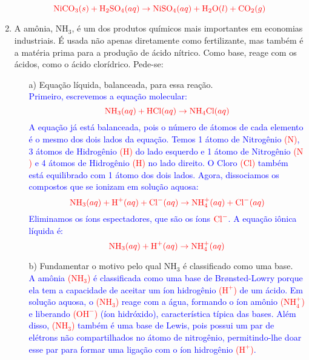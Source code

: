 \documentclass[a4paper, 12pt]{article}
\begin{document}
\begin{enumerate}
          \[
              \textcolor{red}{\text{NiCO}_3 (s) + \text{H}_2\text{SO}_4 (aq) \rightarrow \text{NiSO}_4 (aq) + \text{H}_2\text{O} (l) + \text{CO}_2 (g)}
          \]


    \item A amônia, $\text{NH}_{3}$, é um dos produtos químicos mais importantes
          em economias industriais. É usada não apenas diretamente como fertilizante,
          mas também é a matéria prima para a produção de ácido nítrico. Como base, reage
          com os ácidos, como o ácido clorídrico. Pede-se:
          \begin{enumerate}[align=left, labelsep=-0.5em]
              \item[a)] Equação líquida, balanceada, para essa reação.
                    \\[10pt]
                    \textcolor{blue}{Primeiro, escrevemos a equação molecular:}
                    \[
                        \textcolor{red}{\text{NH}_3 (aq) + \text{HCl} (aq) \rightarrow \text{NH}_4\text{Cl} (aq)}
                    \]
                    \textcolor{blue}{A equação já está balanceada, pois o número de átomos de cada elemento é o mesmo dos dois lados da equação. Temos 1 átomo de Nitrogênio \textcolor{red}{(\(\text{N}\))}, 3 átomos de Hidrogênio \textcolor{red}{(\(\text{H}\))} do lado esquerdo e 1 átomo de Nitrogênio \textcolor{red}{(\(\text{N}\))} e 4 átomos de Hidrogênio \textcolor{red}{(\(\text{H}\))} no lado direito. O Cloro \textcolor{red}{(\(\text{Cl}\))} também está equilibrado com 1 átomo dos dois lados.}
                    \textcolor{blue}{Agora, dissociamos os compostos que se ionizam em solução aquosa:}
                    \[
                        \textcolor{red}{\text{NH}_3 (aq) + \text{H}^+ (aq) + \text{Cl}^- (aq) \rightarrow \text{NH}_4^+ (aq) + \text{Cl}^- (aq)}
                    \]
                    \textcolor{blue}{Eliminamos os íons espectadores, que são os íons \(\textcolor{red}{\text{Cl}^-}\). A equação iônica líquida é:}
                    \[
                        \textcolor{red}{\text{NH}_3 (aq) + \text{H}^+ (aq) \rightarrow \text{NH}_4^+ (aq)}
                    \]
              \item[b)] Fundamentar o motivo pelo qual $\text{NH}_{3}$ é classificado como
                    uma base.
                    \\[10pt]
                    \textcolor{blue}{A amônia \textcolor{red}{(\(\text{NH}_3\))} é classificada como uma base de Brønsted-Lowry porque ela tem a capacidade de aceitar um íon hidrogênio \textcolor{red}{(\(\text{H}^+\))} de um ácido. Em solução aquosa, o \textcolor{red}{(\(\text{NH}_3\))} reage com a água, formando o íon amônio \textcolor{red}{(\(\text{NH}_4^+\))} e liberando \textcolor{red}{(\(\text{OH}^-\))} (íon hidróxido), característica típica das bases. Além disso, \textcolor{red}{(\(\text{NH}_3\))} também é uma base de Lewis, pois possui um par de elétrons não compartilhados no átomo de nitrogênio, permitindo-lhe doar esse par para formar uma ligação com o íon hidrogênio \textcolor{red}{(\(\text{H}^+\))}.}

\end{enumerate}
\end{enumerate}
\end{document}
